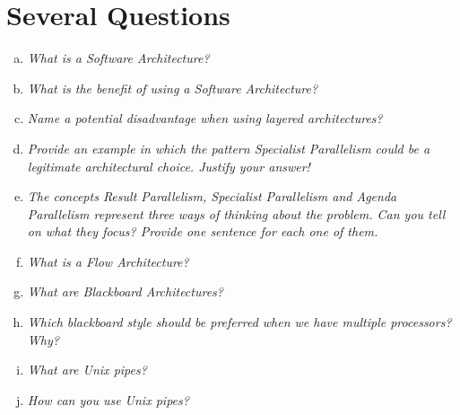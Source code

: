 \documentclass{report}
\author{Marcel \textsc{Zauder} 16-124-836 \\
	Pascal \textsc{Gerig} 16-104-721}
\begin{document}
	\section{Several Questions}
	\startsection
		\begin{enumerate}[a)]
			\item \textit{What is a Software Architecture?} \\
			\item \textit{What is the benefit of using a Software Architecture?} \\
			\item \textit{Name a potential disadvantage when using layered architectures?} \\
			\item \textit{Provide an example in which the pattern Specialist Parallelism could be a legitimate architectural choice. Justify your answer!} \\
			\item \textit{The concepts Result Parallelism, Specialist Parallelism and Agenda Parallelism represent three ways of thinking about the problem. Can you tell on what they focus? Provide one sentence for each one of them.} \\
			\item \textit{What is a Flow Architecture?} \\
			\item \textit{What are Blackboard Architectures?} \\
			\item \textit{Which blackboard style should be preferred when we have multiple processors? Why?} \\
			\item \textit{What are Unix pipes?} \\
			\item \textit{How can you use Unix pipes?} \\
		\end{enumerate}
	\closesection
\end{document}
